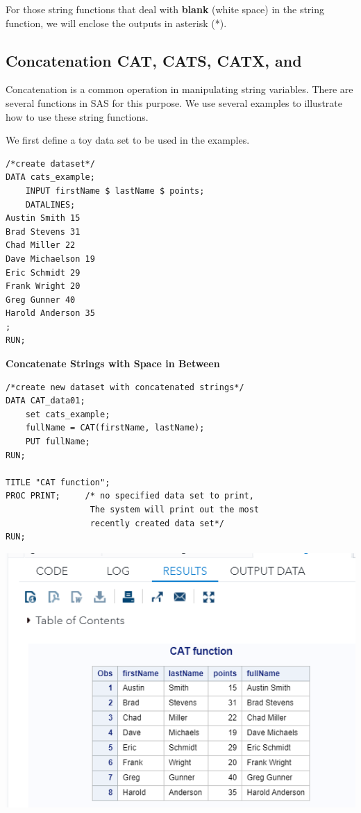 \documentclass[
]{book}
\begin{document}
For those string functions that deal with \textbf{blank} (white space) in the string function, we will enclose the outputs in asterisk (*).

\hypertarget{concatenation-cat-cats-catx-and}{%
\subsection{\texorpdfstring{Concatenation CAT, CATS, CATX, and \texttt{\textbar{}\textbar{}}}{Concatenation CAT, CATS, CATX, and \textbar\textbar{}}}\label{concatenation-cat-cats-catx-and}}

Concatenation is a common operation in manipulating string variables. There are several functions in SAS for this purpose. We use several examples to illustrate how to use these string functions.

We first define a toy data set to be used in the examples.

\begin{verbatim}
/*create dataset*/
DATA cats_example;
    INPUT firstName $ lastName $ points;
    DATALINES;
Austin Smith 15
Brad Stevens 31
Chad Miller 22
Dave Michaelson 19
Eric Schmidt 29
Frank Wright 20
Greg Gunner 40
Harold Anderson 35
;
RUN;
\end{verbatim}

\textbf{Concatenate Strings with Space in Between}

\begin{verbatim}
/*create new dataset with concatenated strings*/
DATA CAT_data01;
    set cats_example;
    fullName = CAT(firstName, lastName);
    PUT fullName;
RUN;

TITLE "CAT function";
PROC PRINT;     /* no specified data set to print, 
                 The system will print out the most
                 recently created data set*/
RUN;
\end{verbatim}

\begin{center}\includegraphics[width=1\linewidth]{img10/w10-CAT-output} \end{center}
\end{document}
